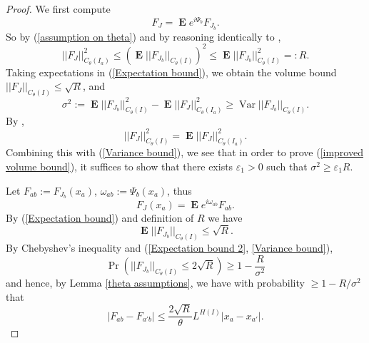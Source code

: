 \documentclass[reqno,10pt]{amsart}
\DeclareMathOperator*{\Expect}{\mathbf E}
\DeclareMathOperator{\Var}{Var}
\theoremstyle{definition}
\numberwithin{equation}{section}
\begin{document}
\begin{proof}
We first compute
$$F_J = \Expect e^{i\Psi_b} F_{J_b}.$$
So by (\ref{assumption on theta}) and by reasoning identically to \cite[Lemma 3.3]{Dyatlov_2018},
\begin{equation}\label{Expectation bound}
||F_J||_{C_\theta(I_a)}^2 \leq \left(\Expect ||F_{J_b}||_{C_\theta(I)}\right)^2 \leq \Expect ||F_{J_b}||_{C_\theta(I)}^2 =: R.
\end{equation}
Taking expectations in (\ref{Expectation bound}), we obtain the volume bound $||F_J||_{C_\theta(I)} \leq \sqrt R$, and
\begin{equation}\label{Variance bound}
\sigma^2 := \Expect ||F_{J_b}||_{C_\theta(I)}^2 - \Expect ||F_J||_{C_\theta(I_a)}^2 \geq \Var ||F_{J_b}||_{C_\theta(I)}.
\end{equation}
By \cite[(3.16)]{Dyatlov_2018},
$$||F_J||_{C_\theta(I)}^2 = \Expect ||F_J||_{C_\theta(I_a)}^2.$$
Combining this with (\ref{Variance bound}), we see that in order to prove (\ref{improved volume bound}), it suffices to show that there exists $\varepsilon_1 > 0$ such that $\sigma^2 \geq \varepsilon_1 R$.

Let $F_{ab} := F_{J_b}(x_a)$, $\omega_{ab} := \Psi_b(x_a)$, thus 
$$F_J(x_a) = \Expect e^{i\omega_{ab}} F_{ab}.$$
By (\ref{Expectation bound}) and definition of $R$ we have 
\begin{equation}\label{Expectation bound 2}
\Expect ||F_{J_b}||_{C_\theta(I)} \leq \sqrt R.
\end{equation}
By Chebyshev's inequality and (\ref{Expectation bound 2}, \ref{Variance bound}),
$$\Pr(||F_{J_b}||_{C_\theta(I)} \leq 2\sqrt R) \geq 1 - \frac{R}{\sigma^2}$$
and hence, by Lemma \ref{theta assumptions}, we have with probability $\geq 1 - R/\sigma^2$ that
\begin{equation}\label{discrepancy upper bound}
|F_{ab} - F_{a'b}| \leq \frac{2\sqrt R}{\theta} L^{H(I)} |x_a - x_{a'}|.
\end{equation}


\end{proof}
\end{document}
